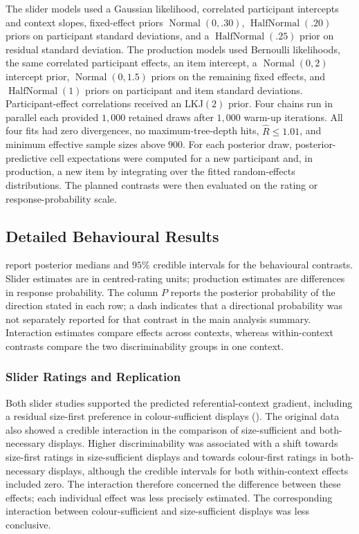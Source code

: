 \documentclass[10pt,a4paper,fleqn]{article}
\begin{document}
The slider models used a Gaussian likelihood, correlated participant intercepts and context slopes, fixed-effect priors $\operatorname{Normal}(0,.30)$, $\operatorname{HalfNormal}(.20)$ priors on participant standard deviations, and a $\operatorname{HalfNormal}(.25)$ prior on residual standard deviation.
The production models used Bernoulli likelihoods, the same correlated participant effects, an item intercept, a $\operatorname{Normal}(0,2)$ intercept prior, $\operatorname{Normal}(0,1.5)$ priors on the remaining fixed effects, and $\operatorname{HalfNormal}(1)$ priors on participant and item standard deviations.
Participant-effect correlations received an LKJ$(2)$ prior.
Four chains run in parallel each provided $1{,}000$ retained draws after $1{,}000$ warm-up iterations.
All four fits had zero divergences, no maximum-tree-depth hits, $\widehat{R}\leq1.01$, and minimum effective sample sizes above $900$.
For each posterior draw, posterior-predictive cell expectations were computed for a new participant and, in production, a new item by integrating over the fitted random-effects distributions.
The planned contrasts were then evaluated on the rating or response-probability scale.


\subsection{Detailed Behavioural Results}
\label{sec:appendix:behavioural-results}

 report posterior medians and $95\%$ credible intervals for the behavioural contrasts.
Slider estimates are in centred-rating units; production estimates are differences in response probability.
The column $P$ reports the posterior probability of the direction stated in each row; a dash indicates that a directional probability was not separately reported for that contrast in the main analysis summary.
Interaction estimates compare effects across contexts, whereas within-context contrasts compare the two discriminability groups in one context.

\subsubsection{Slider Ratings and Replication}

Both slider studies supported the predicted referential-context gradient, including a residual size-first preference in colour-sufficient displays ().
The original data also showed a credible interaction in the comparison of size-sufficient and both-necessary displays.
Higher discriminability was associated with a shift towards size-first ratings in size-sufficient displays and towards colour-first ratings in both-necessary displays, although the credible intervals for both within-context effects included zero.
The interaction therefore concerned the difference between these effects; each individual effect was less precisely estimated.
The corresponding interaction between colour-sufficient and size-sufficient displays was less conclusive.
\end{document}
